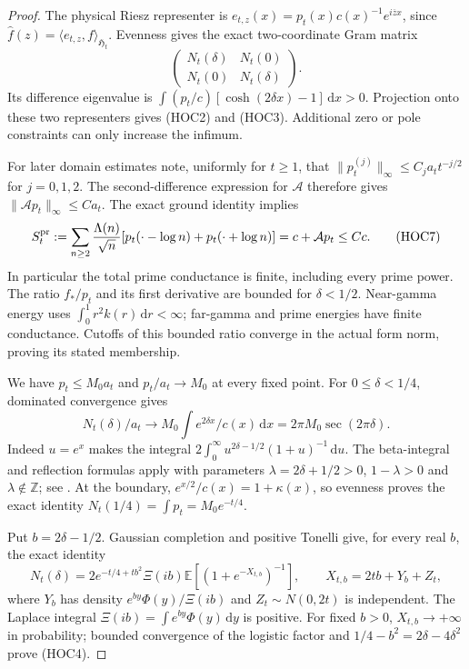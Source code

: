 \documentclass[11pt]{article}
\theoremstyle{remark}\newtheorem{remark}[theorem]{Remark}
\newcommand{\Z}{\mathbb Z}
\newcommand{\dd}{\,\mathrm d}
\begin{document}
\begin{proof}
The physical Riesz representer is
$e_{t,z}(x)=p_t(x)c(x)^{-1}e^{i\overline z x}$, since
$\widehat f(z)=\langle e_{t,z},f\rangle_{\mathfrak H_t}$.
Evenness gives the exact two-coordinate Gram matrix
\[
 \begin{pmatrix}N_t(\delta)&N_t(0)\\N_t(0)&N_t(\delta)\end{pmatrix}.
                                                               \tag{HOC6}
\]
Its difference eigenvalue is
$\int(p_t/c)[\cosh(2\delta x)-1]\dd x>0$.
Projection onto these two representers gives (HOC2) and (HOC3).
Additional zero or pole constraints can only increase the infimum.

For later domain estimates note, uniformly for $t\ge1$, that
$\|p_t^{(j)}\|_\infty\le C_j a_tt^{-j/2}$ for $j=0,1,2$.
The second-difference expression for $\mathcal A$ therefore gives
$\|\mathcal A p_t\|_\infty\le Ca_t$. The exact ground identity implies
\[
 S_t^{\rm pr}:=\sum_{n\ge2}\frac{\Lambda(n)}{\sqrt n}
         [p_t(\cdot-\log n)+p_t(\cdot+\log n)]
             =c+\mathcal A p_t\le Cc .                       \tag{HOC7}
\]
In particular the total prime conductance is finite, including every
prime power. The ratio $f_*/p_t$ and its first derivative are bounded
for $\delta<1/2$. Near-gamma energy uses
$\int_0^1r^2k(r)\dd r<\infty$; far-gamma and prime energies have
finite conductance. Cutoffs of this bounded ratio converge in the
actual form norm, proving its stated membership.

We have $p_t\le M_0a_t$ and $p_t/a_t\to M_0$ at every fixed point.
For $0\le\delta<1/4$, dominated convergence gives
\[
 N_t(\delta)/a_t\longrightarrow
 M_0\int e^{2\delta x}/c(x)\dd x=2\pi M_0\sec(2\pi\delta).
                                                               \tag{HOC8}
\]
Indeed $u=e^x$ makes the integral
$2\int_0^\infty u^{2\delta-1/2}(1+u)^{-1}\dd u$.
The beta-integral and reflection formulas apply with parameters
$\lambda=2\delta+1/2>0$, $1-\lambda>0$ and $\lambda\notin\Z$;
see \cite[eqs.~5.12.1, 5.12.3, 5.5.3]{DLMF}. At the boundary,
$e^{x/2}/c(x)=1+\kappa(x)$, so evenness proves the exact identity
$N_t(1/4)=\int p_t=M_0e^{-t/4}$.

Put $b=2\delta-1/2$. Gaussian completion and positive Tonelli give,
for every real $b$, the exact identity
\[
 N_t(\delta)=2e^{-t/4+tb^2}\Xi(ib)
                 \mathbb E[(1+e^{-X_{t,b}})^{-1}],\qquad
 X_{t,b}=2tb+Y_b+Z_t,                                      \tag{HOC9}
\]
where $Y_b$ has density $e^{by}\Phi(y)/\Xi(ib)$ and
$Z_t\sim N(0,2t)$ is independent. The Laplace integral
$\Xi(ib)=\int e^{by}\Phi(y)\dd y$ is positive. For fixed $b>0$,
$X_{t,b}\to+\infty$ in probability; bounded convergence of the
logistic factor and $1/4-b^2=2\delta-4\delta^2$ prove (HOC4).


\end{proof}
\end{document}
